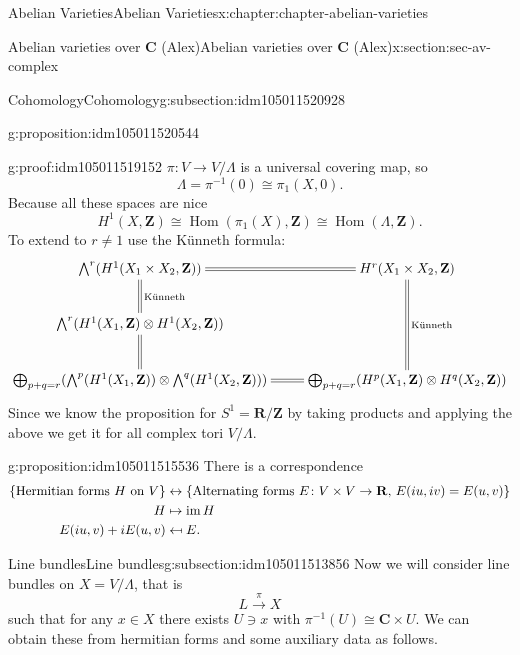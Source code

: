 \documentclass[oneside,10pt,]{book}
\numberwithin{equation}{section}
\providecommand\mapsfrom{\mathrel{\reflectbox{\ensuremath{\mapsto}}}}
\newcommand{\ZZ}{\mathbf{Z}}
\newcommand{\RR}{\mathbf{R}}
\newcommand{\CC}{\mathbf{C}}
\DeclareMathOperator{\Hom}{Hom}
\DeclareMathOperator{\im}{im}
\newcommand{\amp}{&}
\begin{document}
\begin{chapterptx}{Abelian Varieties}{}{Abelian Varieties}{}{}{x:chapter:chapter-abelian-varieties}
\begin{sectionptx}{Abelian varieties over \(\CC\) (Alex)}{}{Abelian varieties over \(\CC\) (Alex)}{}{}{x:section:sec-av-complex}
\begin{subsectionptx}{Cohomology}{}{Cohomology}{}{}{g:subsection:idm105011520928}
\begin{proposition}{}{}{g:proposition:idm105011520544}
%
\end{proposition}
\begin{proofptx}{}{g:proof:idm105011519152}
\(\pi\colon V\to V/\Lambda\) is a universal covering map, so%
\begin{equation*}
\Lambda = \pi^{-1} (0 ) \cong \pi_1(X,0)\text{.}
\end{equation*}
Because all these spaces are nice%
\begin{equation*}
H^1 (X,\ZZ) \cong \Hom(\pi_1(X), \ZZ) \cong \Hom(\Lambda, \ZZ)\text{.}
\end{equation*}
To extend to \(r \ne 1\) use the Künneth formula:%
\begin{equation*}
\xymatrix{
\bigwedge^r(H^1(X_1\times X_2, \ZZ)) \ar@{=}[r]\ar@{=}[d]^{\text{Künneth}} & H^r(X_1\times X_2 , \ZZ)\ar@{=}[dd]^{\text{Künneth}}\\
\bigwedge^r(H^1(X_1, \ZZ)\otimes H^1(X_2, \ZZ)) \ar@{=}[d]& \\
\bigoplus_{p+q=r}(\bigwedge^p(H^1(X_1, \ZZ))\otimes\bigwedge^q(H^1(X_2, \ZZ))) \ar@{=}[r] & \bigoplus_{p+q=r}(H^p(X_1, \ZZ)\otimes H^q(X_2, \ZZ))
}
\end{equation*}
Since we know the proposition for \(S^1 = \RR/\ZZ\) by taking products and applying the above we get it for all complex tori \(V/\Lambda\).%
\end{proofptx}
\begin{proposition}{}{}{g:proposition:idm105011515536}%
There is a correspondence%
\begin{align*}
\{\text{Hermitian forms }H \text{ on } V\} \amp\leftrightarrow\{\text{Alternating forms }E\colon V\times V\to\RR,\,E(iu,iv) = E(u,v)\}\\
H\amp\mapsto \im H\\
E(iu,v)+ i E(u,v) \amp\mapsfrom E\text{.}
\end{align*}
%
\end{proposition}
\end{subsectionptx}
%
%
\typeout{************************************************}
\typeout{************************************************}
%
\begin{subsectionptx}{Line bundles}{}{Line bundles}{}{}{g:subsection:idm105011513856}
Now we will consider line bundles on \(X = V/\Lambda\), that is%
\begin{equation*}
L\xrightarrow{\pi} X
\end{equation*}
such that for any \(x\in X\) there exists \(U\ni x\) with \(\pi^{-1} (U) \cong \CC \times U\). We can obtain these from hermitian forms and some auxiliary data as follows.%

\end{subsectionptx}
\end{sectionptx}
\end{chapterptx}
\end{document}
